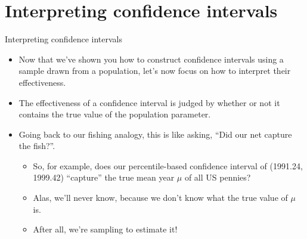 \documentclass[
  ignorenonframetext,
]{beamer}
\providecommand{\tightlist}{%
  \setlength{\itemsep}{0pt}\setlength{\parskip}{0pt}}
\begin{document}
\hypertarget{interpreting-confidence-intervals}{%
\section{Interpreting confidence
intervals}\label{interpreting-confidence-intervals}}

\begin{frame}{Interpreting confidence intervals}
\protect\hypertarget{interpreting-confidence-intervals-1}{}
\begin{itemize}
\item
  Now that we've shown you how to construct confidence intervals using a
  sample drawn from a population, let's now focus on how to interpret
  their effectiveness.
\item
  The effectiveness of a confidence interval is judged by whether or not
  it contains the true value of the population parameter.
\item
  Going back to our fishing analogy, this is like asking, ``Did our net
  capture the fish?''.

  \begin{itemize}
  \tightlist
  \item
    So, for example, does our percentile-based confidence interval of
    (1991.24, 1999.42) ``capture'' the true mean year \(\mu\) of all US
    pennies?
  \item
    Alas, we'll never know, because we don't know what the true value of
    \(\mu\) is.
  \item
    After all, we're sampling to estimate it!
  \end{itemize}
\end{itemize}
\end{frame}
\end{document}
